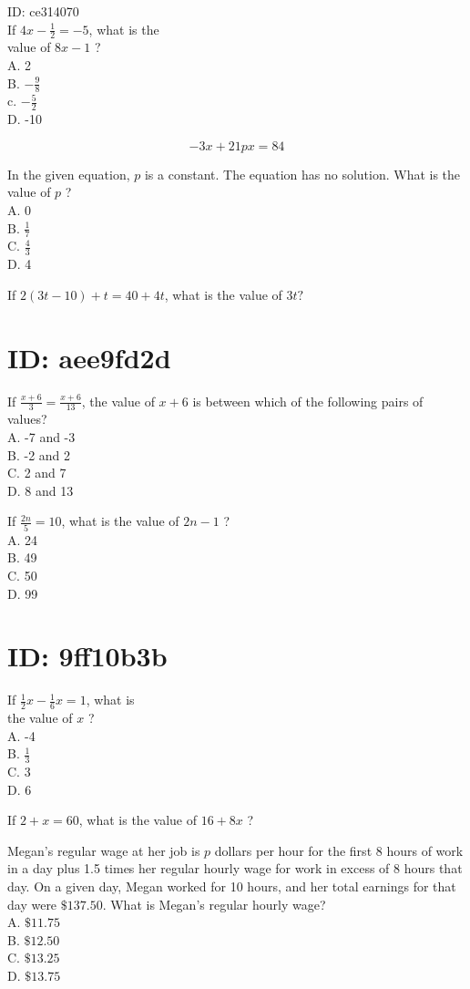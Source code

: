 ID: ce314070\\
If $4 x-\frac{1}{2}=-5$, what is the\\
value of $8 x-1$ ?\\
A. 2\\
B. $-\frac{9}{8}$\\
c. $-\frac{5}{2}$\\
D. -10

$$
-3 x+21 p x=84
$$

In the given equation, $p$ is a constant. The equation has no solution. What is the value of $p$ ?\\
A. 0\\
B. $\frac{1}{7}$\\
C. $\frac{4}{3}$\\
D. 4

If $2(3 t-10)+t=40+4 t$, what is the value of $3 t ?$

\section*{ID: aee9fd2d}
If $\frac{x+6}{3}=\frac{x+6}{13}$, the value of $x+6$ is between which of the following pairs of values?\\
A. -7 and -3\\
B. -2 and 2\\
C. 2 and 7\\
D. 8 and 13

If $\frac{2 n}{5}=10$, what is the value of $2 n-1$ ?\\
A. 24\\
B. 49\\
C. 50\\
D. 99

\section*{ID: 9ff10b3b}
If $\frac{1}{2} x-\frac{1}{6} x=1$, what is\\
the value of $x$ ?\\
A. -4\\
B. $\frac{1}{3}$\\
C. 3\\
D. 6

If $2+x=60$, what is the value of $16+8 x$ ?

Megan's regular wage at her job is $p$ dollars per hour for the first 8 hours of work in a day plus 1.5 times her regular hourly wage for work in excess of 8 hours that day. On a given day, Megan worked for 10 hours, and her total earnings for that day were $\$ 137.50$. What is Megan's regular hourly wage?\\
A. $\$ 11.75$\\
B. $\$ 12.50$\\
C. $\$ 13.25$\\
D. $\$ 13.75$

